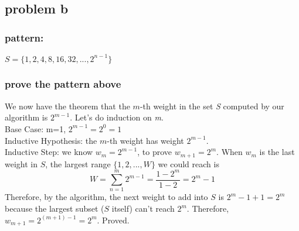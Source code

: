 \documentclass{article}
\begin{document}
        \subsection{problem b}
        \subsubsection{pattern:}
            $S = \{1, 2, 4, 8, 16, 32, ..., 2^{n-1}\}$
        \subsubsection{prove the pattern above}
            We now have the theorem that the $m$-th weight in the set \textit{S} computed by our algorithm is $2^{m-1}$. Let's do induction on \textit{m}.\\
            Base Case: m=1, $2^{m-1}=2^0=1$\\
            Inductive Hypothesis: the $m$-th weight has weight $2^{m-1}$.\\
            Inductive Step: we know $w_m=2^{m-1}$, to prove $w_{m+1}=2^{m}$. When $w_m$ is the last weight in $S$, the largest range $\{1,2,...,W\}$ we could reach is 
    \[ W = \sum_{n=1}^{m} 2^{m-1} = \frac{1-2^m}{1-2}=2^m-1 \]
            Therefore, by the algorithm, the next weight to add into $S$ is $2^m-1+1=2^m$ because the largest subset ($S$ itself) can't reach $2^m$. Therefore, $w_{m+1}=2^{(m+1)-1}=2^m$. Proved.
            
        
        
\end{document}
